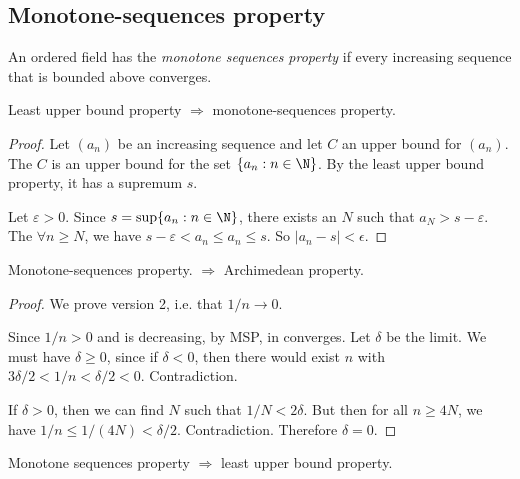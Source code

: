 \documentclass[a4paper]{article}
\begin{document}
\subsection{Monotone-sequences property}
\begin{defi}
  An ordered field has the \emph{monotone sequences property} if every increasing sequence that is bounded above converges.
\end{defi}

\begin{lemma}
  Least upper bound property $\Rightarrow$ monotone-sequences property.
\end{lemma}

\begin{proof}
  Let $(a_n)$ be an increasing sequence and let $C$ an upper bound for $(a_n)$. The $C$ is an upper bound for the set $\{a_n: n \in \N\}$. By the least upper bound property, it has a supremum $s$.

  Let $\varepsilon > 0$. Since $s = \sup \{a_n: n\in \N\}$, there exists an $N$ such that $a_N > s - \varepsilon$. The $\forall n \geq N$, we have $s - \varepsilon < a_n \leq a_n \leq s$. So $|a_n - s| < \epsilon$.
\end{proof}

\begin{lemma}
  Monotone-sequences property. $\Rightarrow$ Archimedean property.
\end{lemma}

\begin{proof}
  We prove version 2, i.e. that $1/n \to 0$.

  Since $1/n > 0$ and is decreasing, by MSP, in converges. Let $\delta$ be the limit. We must have $\delta \geq 0$, since if $\delta < 0$, then there would exist $n$ with $3\delta/2 < 1/n < \delta/2 < 0$. Contradiction.

  If $\delta > 0$, then we can find $N$ such that $1/N < 2\delta$. But then for all $n \geq 4N$, we have $1/n \leq 1/(4N) < \delta/2$. Contradiction. Therefore $\delta = 0$.
\end{proof}

\begin{lemma}
  Monotone sequences property $\Rightarrow$ least upper bound property.
\end{lemma}
\end{document}
